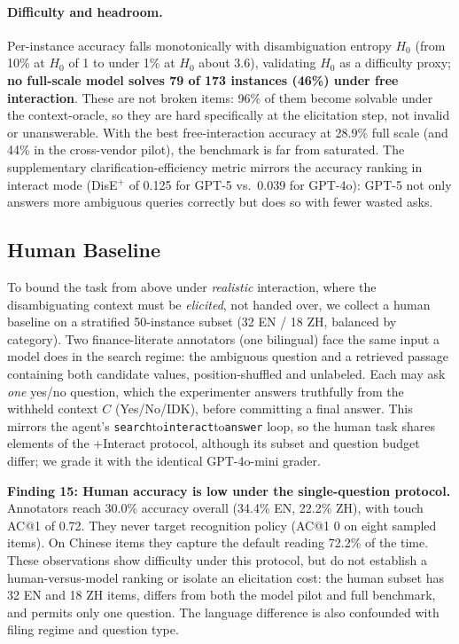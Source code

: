 \paragraph{Difficulty and headroom.} Per-instance accuracy falls monotonically
with disambiguation entropy $H_0$ (from 10\% at $H_0$ of 1 to under 1\% at
$H_0$ about 3.6), validating $H_0$ as a difficulty proxy; \textbf{no full-scale model
solves 79 of 173 instances (46\%) under free interaction}. These are not broken items:
96\% of them become solvable under the context-oracle, so they are hard specifically at
the elicitation step, not invalid or unanswerable. With the best free-interaction accuracy
at 28.9\% full scale (and 44\% in the cross-vendor pilot), the benchmark is far from
saturated. The supplementary clarification-efficiency
metric mirrors the accuracy ranking in interact mode (DisE$^+$ of 0.125 for GPT-5
vs.\ 0.039 for GPT-4o): GPT-5 not only answers more ambiguous queries correctly
but does so with fewer wasted asks.

\subsection{Human Baseline}
\label{sec:humanbaseline}

To bound the task from above under \emph{realistic} interaction, where the
disambiguating context must be \emph{elicited}, not handed over, we collect a
human baseline on a stratified 50-instance subset (32 EN / 18 ZH, balanced by
category). Two finance-literate annotators (one bilingual) face the same input a
model does in the search regime: the ambiguous question and a retrieved passage
containing both candidate values, position-shuffled and unlabeled. Each may ask
\emph{one} yes/no question, which the experimenter answers truthfully from the
withheld context $C$ (Yes/No/IDK), before committing a final answer. This mirrors
the agent's \texttt{search}to\texttt{interact}to\texttt{answer} loop, so the
human task shares elements of the +Interact protocol, although its subset and question budget differ; we grade it with the
identical GPT-4o-mini grader.

\textbf{Finding 15: Human accuracy is low under the single-question protocol.} Annotators reach 30.0\% accuracy overall (34.4\% EN, 22.2\% ZH), with touch AC@1 of 0.72. They never target recognition policy (AC@1 0 on eight sampled items). On Chinese items they capture the default reading 72.2\% of the time. These observations show difficulty under this protocol, but do not establish a human-versus-model ranking or isolate an elicitation cost: the human subset has 32 EN and 18 ZH items, differs from both the model pilot and full benchmark, and permits only one question. The language difference is also confounded with filing regime and question type.

